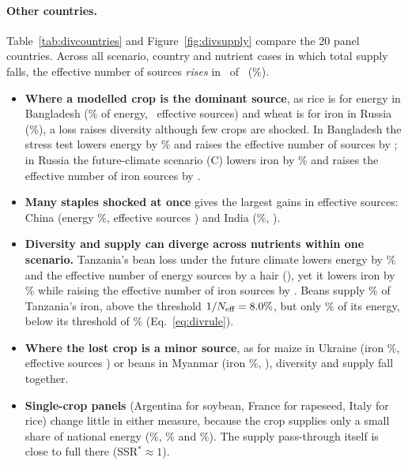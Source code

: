 \begin{table}[H]\centering\small
\caption[India: supply and diversity after losses]{India: change in national supply (\%) / change in effective
number of sources $N_{\text{eff}}$, and MAR change (points), by scenario. Upper bound of the supply pass-through.}
\label{tab:divindia}
\end{table}

\paragraph{Other countries.} Table~\ref{tab:divcountries} and Figure~\ref{fig:divsupply} compare the 20 panel
countries. Across all scenario, country and nutrient cases in which total supply falls, the effective number of
sources \emph{rises} in \divNUp\ of \divNCases\ (\divPctUp\%).
\begin{itemize}
\item \textbf{Where a modelled crop is the dominant source}, as rice is for energy in Bangladesh
(\divBdTopKcalShare\% of energy, \divBdEffKcal\ effective sources) and wheat is for iron in Russia
(\divRuTopIronShare\%), a loss raises diversity although few crops are shocked. In Bangladesh the stress test lowers
energy by \divBdBKcalPctAbs\% and raises the effective number of sources by \divBdBKcalDEffAbs; in Russia the future-climate
scenario (C) lowers iron by \divRuCIronPctAbs\% and raises the effective number of iron sources by \divRuCIronDEffAbs.
\item \textbf{Many staples shocked at once} gives the largest gains in effective sources: China (energy
\divCnBKcalPct\%, effective sources \divCnBKcalDEff) and India (\divIndBKcalPct\%, \divIndBKcalDEff).
\item \textbf{Diversity and supply can diverge across nutrients within one scenario.} Tanzania's bean loss under the
future climate lowers energy by \divTzCKcalPctAbs\% and the effective number of energy sources by a hair
(\divTzCKcalDEff), yet it lowers iron by \divTzCIronPctAbs\% while raising the effective number of iron sources by
\divTzCIronDEffAbs. Beans supply \divTzBeanIronShare\% of Tanzania's iron, above the threshold $1/N_{\text{eff}}=
8.0\%$, but only \divTzBeanKcalShare\% of its energy, below its threshold of \divTzThreshKcal\%
(Eq.~\ref{eq:divrule}).
\item \textbf{Where the lost crop is a minor source}, as for maize in Ukraine (iron \divUaCIronPct\%, effective
sources \divUaCIronDEff) or beans in Myanmar (iron \divMmCIronPct\%, \divMmCIronDEff), diversity and supply fall
together.
\item \textbf{Single-crop panels} (Argentina for soybean, France for rapeseed, Italy for rice) change little in
either measure, because the crop supplies only a small share of national energy (\divArgSoyKcalShare\%,
\divFrRapeKcalShare\% and \divItRiceKcalShare\%). The supply pass-through itself is close to full there
(SSR$^{*}\approx1$).
\end{itemize}

